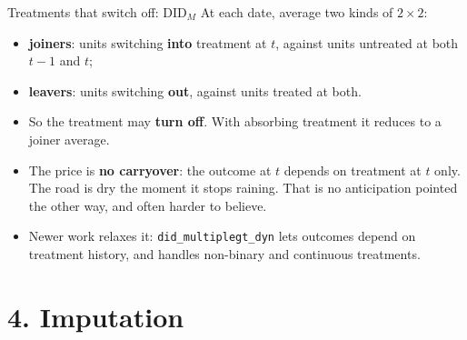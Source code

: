 \documentclass[
  11pt,
  ignorenonframetext,
  aspectratio=169,
]{beamer}
\providecommand{\tightlist}{%
  \setlength{\itemsep}{0pt}\setlength{\parskip}{0pt}}
\begin{document}
\begin{frame}[fragile]{Treatments that switch off: \(\text{DID}_M\)}
\protect{}\label{treatments-that-switch-off-textdid_m}
At each date, average two kinds of \(2 \times 2\):

\begin{itemize}
\tightlist
\item
  \textbf{joiners}: units switching \textbf{into} treatment at \(t\),
  against units untreated at both \(t-1\) and \(t\);
\item
  \textbf{leavers}: units switching \textbf{out}, against units treated
  at both.
\end{itemize}

\vspace{0.3em}

\begin{itemize}
\tightlist
\item
  So the treatment may \textbf{turn off}. With absorbing treatment it
  reduces to a joiner average.
\item
  The price is \textbf{no carryover}: the outcome at \(t\) depends on
  treatment at \(t\) only. The road is dry the moment it stops raining.
  That is no anticipation pointed the other way, and often harder to
  believe.
\item
  Newer work relaxes it: \texttt{did\_multiplegt\_dyn} lets outcomes
  depend on treatment history, and handles non-binary and continuous
  treatments.
\end{itemize}
\end{frame}

\section{4. Imputation}\label{imputation}
\end{document}
